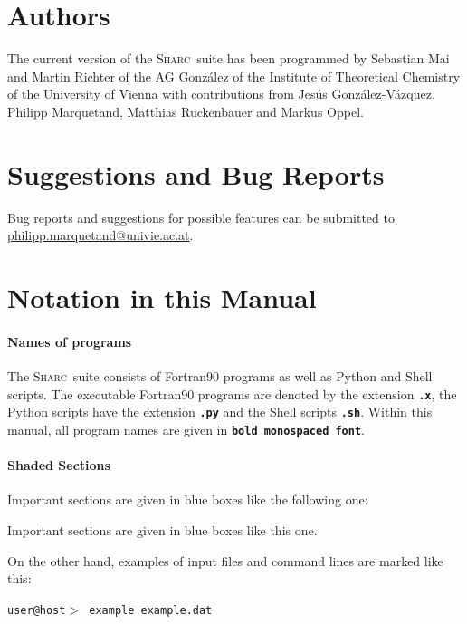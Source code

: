 \documentclass[a4paper,11pt,DIV=15,openany,twoside=false]{scrbook}
\newcommand{\ttmdump}[1]{#1}
\newcommand{\sharc}{\textsc{Sharc}}
\newcommand{\ttt}[1]{\textbf{\texttt{#1}}}
\newenvironment{example}{
  \vspace{0mm}
  \definecolor{shadecolor}{HTML}{E4F4FF}
  \begin{shaded}
}{
  \end{shaded}
}
\begin{document}
\section{Authors}

The current version of the \sharc\ suite has been programmed by Sebastian Mai and Martin Richter of the AG Gonz\'alez of the Institute of Theoretical Chemistry of the University of Vienna with contributions from Jes\'us Gonz\'alez-V\'azquez, Philipp Marquetand, Matthias Ruckenbauer and Markus Oppel.

\section{Suggestions and Bug Reports}

\begin{shaded}
Bug reports and suggestions for possible features can be submitted to \href{mailto:philipp.marquetand@univie.ac.at}{philipp.marquetand@univie.ac.at}.
\end{shaded}

\section{Notation in this Manual}

\paragraph{Names of programs}

The \sharc\ suite consists of Fortran90 programs as well as Python and Shell scripts. The executable Fortran90 programs are denoted by the extension \ttt{.x}, the Python scripts have the extension \ttt{.py} and the Shell scripts \ttt{.sh}. Within this manual, all program names are given in \ttt{bold monospaced font}.

\ttmdump{
\paragraph{Shaded Sections}

Important sections are given in blue boxes like the following one:
\begin{shaded}
Important sections are given in blue boxes like this one.
\end{shaded}

On the other hand, examples of input files and command lines are marked like this:
\begin{example}
  \tt user@host$>$ example example.dat
\end{example}
}
\end{document}
